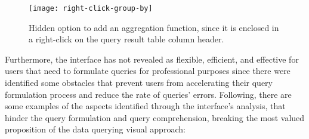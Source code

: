 \begin{figure}[htbp]
	\centering
	\texttt{[image: right-click-group-by]}
	\caption{Hidden option to add an aggregation function, since it is enclosed in a right-click on the query result table column header.}
	\label{fig:rightClickGroupBy}
\end{figure}

Furthermore, the interface has not revealed as flexible, efficient, and effective for users that need to formulate queries for professional purposes since there were identified some obstacles that prevent users from accelerating their query formulation process and reduce the rate of queries' errors. Following, there are some examples of the aspects identified through the interface's analysis, that hinder the query formulation and query comprehension, breaking the most valued proposition of the data querying visual approach:

